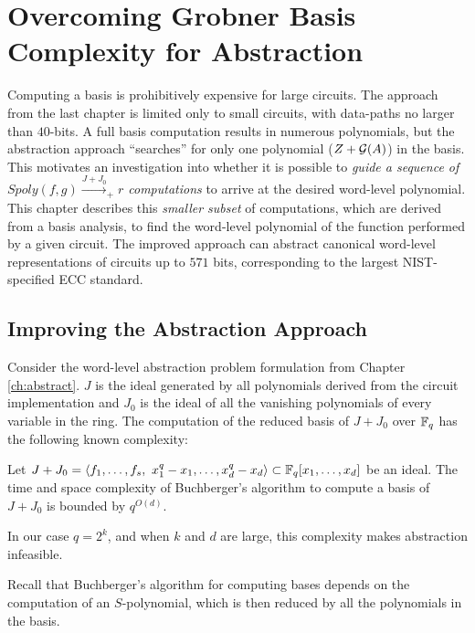 \chapter{Overcoming Grobner Basis Complexity for Abstraction} \label{ch:improv}

Computing a \Grobner basis is prohibitively expensive for large circuits. 
The approach from the last 
chapter is limited only to small circuits, with data-paths no larger than 
$40$-bits. 
A full \Grobner basis computation results in numerous polynomials, but
the abstraction approach ``searches'' for only one
polynomial ($Z + {\mathcal{G}}(A)$) in the basis. This motivates an investigation into
whether it is possible to {\it  guide a sequence of $Spoly(f,
  g)\xrightarrow{J+J_0}_+ r$  computations} to arrive at the desired
word-level polynomial. This chapter describes this 
{\it smaller subset} of computations, which are derived from a \Grobner basis 
analysis, to find the word-level polynomial of the function performed by a 
given circuit. The improved approach can abstract canonical word-level 
representations of circuits up to $571$ bits, 
corresponding to the largest NIST-specified ECC standard. 

\section{Improving the Abstraction Approach}
Consider the word-level abstraction problem formulation from 
Chapter \ref{ch:abstract}. $J$ is the ideal 
generated by all polynomials derived from the circuit implementation and 
$J_0$ is the ideal of all the vanishing polynomials of 
every variable in the ring. 
The computation of the reduced \Grobner basis of $J+J_0$ over ${\mathbb{F}}_{q}$ 
has the following known complexity\cite{gao:gf-gb-ms}:

\begin{Theorem}
Let $J+J_0 = \langle f_1, \dots, f_s, ~x_1^q - x_1, \dots, x_d^q -
x_d\rangle \subset {\mathbb{F}}_{q} [x_1, \dots, x_d]$ be an ideal. The time and
space complexity of Buchberger's algorithm to compute a \Grobner
basis of $J+J_0$ is bounded by $q^{O(d)}$.
\end{Theorem}

In our case $q = 2^k$, and when $k$ and $d$ are large, this complexity 
makes abstraction infeasible.

Recall that Buchberger's algorithm \cite{buchberger_thesis} for 
computing \Grobner bases depends on the computation of an $S$-polynomial, 
which is then reduced by all the polynomials in the basis. 

